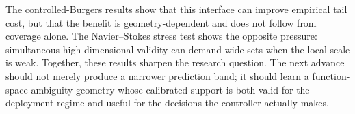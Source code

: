 \documentclass[10pt]{article}
\begin{document}
The controlled-Burgers results show that this interface can improve empirical
tail cost, but that the benefit is geometry-dependent and does not follow from
coverage alone. The Navier--Stokes stress test shows the opposite pressure:
simultaneous high-dimensional validity can demand wide sets when the local
scale is weak. Together, these results sharpen the research question. The next
advance should not merely produce a narrower prediction band; it should learn
a function-space ambiguity geometry whose calibrated support is both valid for
the deployment regime and useful for the decisions the controller actually
makes.

\begingroup
\footnotesize
\setlength{\bibsep}{2pt}


\endgroup
\end{document}
